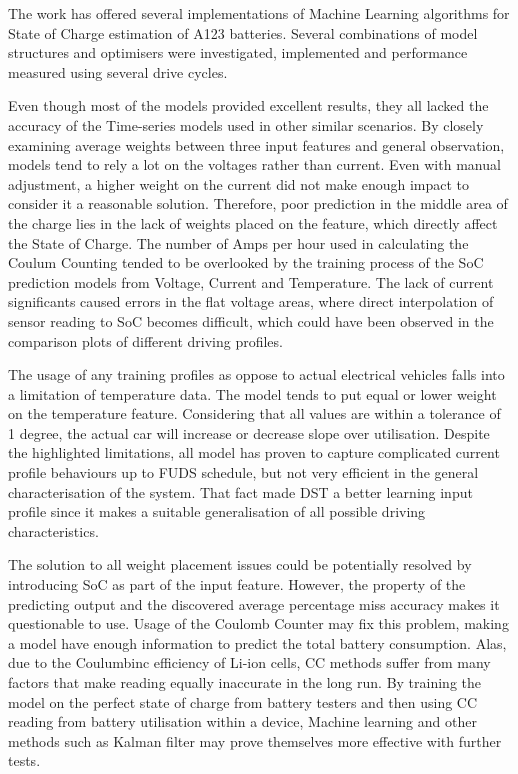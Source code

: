 The work has offered several implementations of Machine Learning algorithms for State of Charge estimation of A123 batteries.
Several combinations of model structures and optimisers were investigated, implemented and performance measured using several drive cycles.

%
%
Even though most of the models provided excellent results, they all lacked the accuracy of the Time-series models used in other similar scenarios.
By closely examining average weights between three input features and general observation, models tend to rely a lot on the voltages rather than current.
Even with manual adjustment, a higher weight on the current did not make enough impact to consider it a reasonable solution.
Therefore, poor prediction in the middle area of the charge lies in the lack of weights placed on the feature, which directly affect the State of Charge.
The number of Amps per hour used in calculating the Coulum Counting tended to be overlooked by the training process of the SoC prediction models from Voltage, Current and Temperature.
The lack of current significants caused errors in the flat voltage areas, where direct interpolation of sensor reading to SoC becomes difficult, which could have been observed in the comparison plots of different driving profiles. 

%
%
The usage of any training profiles as oppose to actual electrical vehicles falls into a limitation of temperature data.
The model tends to put equal or lower weight on the temperature feature. Considering that all values are within a tolerance of 1 degree, the actual car will increase or decrease slope over utilisation. 
Despite the highlighted limitations, all model has proven to capture complicated current profile behaviours up to FUDS schedule, but not very efficient in the general characterisation of the system.
That fact made DST a better learning input profile since it makes a suitable generalisation of all possible driving characteristics.

%
%
The solution to all weight placement issues could be potentially resolved by introducing SoC as part of the input feature.
However, the property of the predicting output and the discovered average percentage miss accuracy makes it questionable to use.
Usage of the Coulomb Counter may fix this problem, making a model have enough information to predict the total battery consumption.
Alas, due to the Coulumbinc efficiency of Li-ion cells, CC methods suffer from many factors that make reading equally inaccurate in the long run.
By training the model on the perfect state of charge from battery testers and then using CC reading from battery utilisation within a device, Machine learning and other methods such as Kalman filter may prove themselves more effective with further tests.

